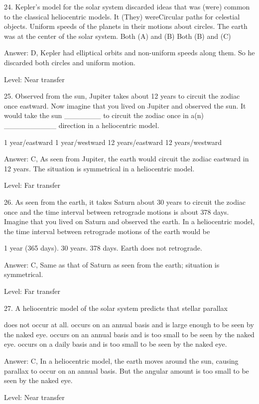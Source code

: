     24. Kepler's model for the solar system discarded ideas that was (were) common to the classical heliocentric models. It (They) wereCircular paths for celestial objects.
    Uniform speeds of the planets in their motions about circles.
    The earth was at the center of the solar system.
    Both (A) and (B)
    Both (B) and (C) 

Answer: D, Kepler had elliptical orbits and non-uniform speeds along them. So he discarded both circles and uniform motion.

Level: Near transfer

25. Observed from the sun, Jupiter takes about 12 years to circuit the zodiac once eastward. Now imagine that you lived on Jupiter and observed the sun. It would take the sun _______ to circuit the zodiac once in a(n) __________ direction in a heliocentric model.

    1 year/eastward
    1 year/westward
    12 years/eastward
    12 years/westward 

Answer: C, As seen from Jupiter, the earth would circuit the zodiac eastward in 12 years. The situation is symmetrical in a heliocentric model.

Level: Far transfer

26. As seen from the earth, it takes Saturn about 30 years to circuit the zodiac once and the time interval between retrograde motions is about 378 days. Imagine that you lived on Saturn and observed the earth. In a heliocentric model, the time interval between retrograde motions of the earth would be

    1 year (365 days).
    30 years.
    378 days.
    Earth does not retrograde. 

Answer: C, Same as that of Saturn as seen from the earth; situation is symmetrical.

Level: Far transfer

27. A heliocentric model of the solar system predicts that stellar parallax

    does not occur at all.
    occurs on an annual basis and is large enough to be seen by the naked eye.
    occurs on an annual basis and is too small to be seen by the naked eye.
    occurs on a daily basis and is too small to be seen by the naked eye. 

Answer: C, In a heliocentric model, the earth moves around the sun, causing parallax to occur on an annual basis. But the angular amount is too small to be seen by the naked eye.

Level: Near transfer

